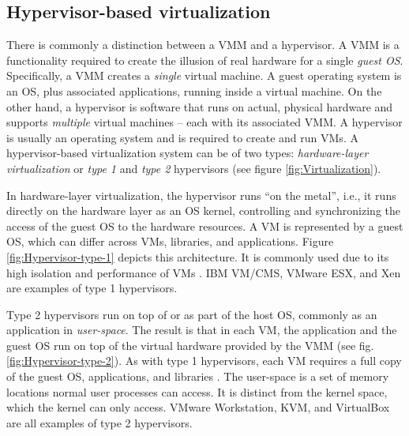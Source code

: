 \subsection{Hypervisor-based virtualization}
There is commonly a distinction between a VMM and a hypervisor. A VMM is a functionality required to create the illusion of real hardware for a single \emph{guest OS}. Specifically, a VMM creates a \emph{single} virtual machine. A guest operating system is an OS, plus associated applications, running inside a virtual machine. On the other hand, a hypervisor is software that runs on actual, physical hardware and supports \emph{multiple} virtual machines -- each with its associated VMM. A hypervisor is usually an operating system and is required to create and run VMs. A hypervisor-based virtualization system can be of two types: \emph{hardware-layer virtualization} or \emph{type 1} and \emph{type 2} hypervisors (see figure \ref{fig:Virtualization}). 

In hardware-layer virtualization, the hypervisor runs ``on the metal'', i.e., it runs directly on the hardware layer as an OS kernel, controlling and synchronizing the access of the guest OS to the hardware resources. A VM is represented by a guest OS, which can differ across VMs, libraries, and applications. Figure \ref{fig:Hypervisor-type-1} depicts this architecture. It is commonly used due to its high isolation and performance of VMs \cite{Sahoo2010}. IBM VM/CMS, VMware ESX, and Xen are examples of type 1 hypervisors.

Type 2 hypervisors run on top of or as part of the host OS, commonly as an application in \emph{user-space}. The result is that in each VM, the application and the guest OS run on top of the virtual hardware provided by the VMM (see fig. \ref{fig:Hypervisor-type-2}). As with type 1 hypervisors, each VM requires a full copy of the guest OS, applications, and libraries \cite{Sahoo2010}. The user-space is a set of memory locations normal user processes can access. It is distinct from the kernel space, which the kernel can only access. %
VMware Workstation, KVM, and VirtualBox are all examples of type 2 hypervisors.

